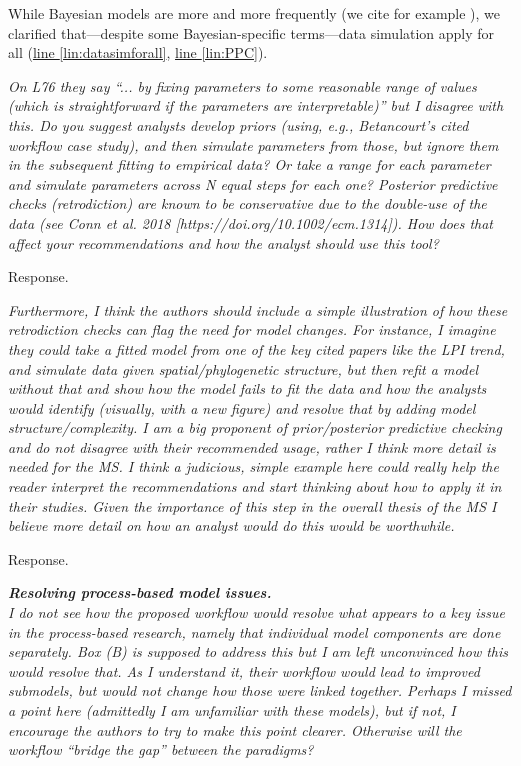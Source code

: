 \documentclass[11pt,letter]{article}
\begin{document}
While Bayesian models are more and more frequently (we cite for example ), we clarified that---despite some Bayesian-specific terms---data simulation apply for all (\href{file:forecastflows_r1\#lintarget:datasimforall}{line \ref*{lin:datasimforall}}, \href{file:forecastflows_r1\#lintarget:PPC}{line \ref*{lin:PPC}}).

\begin{mybox}
\emph{On L76 they say “... by fixing parameters to some reasonable range of values (which is straightforward if the parameters are interpretable)” but I disagree with this. Do you suggest analysts develop priors (using, e.g., Betancourt’s cited workflow case study), and then simulate parameters from those, but ignore them in the subsequent fitting to empirical data? Or take a range for each parameter and simulate parameters across N equal steps for each one? Posterior predictive checks (retrodiction) are known to be conservative due to the double-use of the data (see Conn et al. 2018 [https://doi.org/10.1002/ecm.1314]). How does that affect your recommendations and how the analyst should use this tool?}
\end{mybox}

Response.

\begin{mybox}
\emph{Furthermore, I think the authors should include a simple illustration of how these retrodiction checks can flag the need for model changes. For instance, I imagine they could take a fitted model from one of the key cited papers like the LPI trend, and simulate data given spatial/phylogenetic structure, but then refit a model without that and show how the model fails to fit the data and how the analysts would identify (visually, with a new figure) and resolve that by adding model structure/complexity. I am a big proponent of prior/posterior predictive checking and do not disagree with their recommended usage, rather I think more detail is needed for the MS. I think a judicious, simple example here could really help the reader interpret the recommendations and start thinking about how to apply it in their studies. Given the importance of this step in the overall thesis of the MS I believe more detail on how an analyst would do this would be worthwhile.}
\end{mybox}

Response.

\begin{mybox}
\emph{\textbf{Resolving process-based model issues.}\\
I do not see how the proposed workflow would resolve what appears to a key issue in the process-based research, namely that individual model components are done separately. Box (B) is supposed to address this but I am left unconvinced how this would resolve that. As I understand it, their workflow would lead to improved submodels, but would not change how those were linked together. Perhaps I missed a point here (admittedly I am unfamiliar with these models), but if not, I encourage the authors to try to make this point clearer. Otherwise will the workflow “bridge the gap” between the paradigms?}
\end{mybox}
\end{document}
